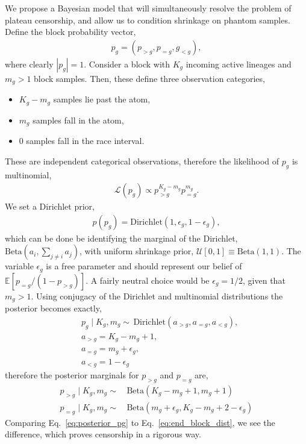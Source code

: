 \documentclass[pdflatex,sn-basic,icol]{sn-jnl}
\newcommand{\E}{\mathbb{E}}
\theoremstyle{plain}
\theoremstyle{definition}
\begin{document}
We propose a Bayesian model that will simultaneously resolve the problem of plateau censorship, and allow us to condition shrinkage on phantom samples.
Define the block probability vector,
\begin{align}
    p_g = (p_{>g}, p_{=g}, g_{<g}),
\end{align}
where clearly $|p_g| = 1$.
Consider a block with $K_g$ incoming active lineages and $m_g>1$ block samples.
Then, these define three observation categories,
\begin{itemize}
    \item $K_g - m_g$ samples lie past the atom,
    \item $m_g$ samples fall in the atom,
    \item $0$  samples fall in the race interval.
\end{itemize}
These are independent categorical observations, therefore the likelihood of $p_g$ is multinomial,
\begin{align}
    \mathcal{L}(p_g) \propto p_{>g}^{K_g - m_g} p_{=g}^{m_g}.
\end{align}
We set a Dirichlet prior,
\begin{align}
    p(p_g) = \mathrm{Dirichlet}(1, \epsilon_g, 1 - \epsilon_g),
\end{align}
which can be done be identifying the marginal of the Dirichlet, $\mathrm{Beta}(a_i, \sum_{j \neq i} a_j)$, with uniform shrinkage prior, $\mathcal{U}[0,1] \equiv \mathrm{Beta}(1, 1)$.
The variable $\epsilon_g$ is a free parameter and should represent our belief of $\E[p_{=g}/(1 - p_{>g})]$.
A fairly neutral choice would be $\epsilon_g=1/2$, given that $m_g > 1$.
Using conjugacy of the Dirichlet and multinomial distributions the posterior becomes exactly,
\begin{align}
    &p_g \mid K_g, m_g \sim\, \mathrm{Dirichlet}(a_{>g}, a_{=g}, a_{<g}),\label{eq:post_pg}\\
    &a_{>g}= K_g - m_g + 1,\\
    &a_{=g}= m_g + \epsilon_g,\\
    &a_{<g}= 1 - \epsilon_g
\end{align}
therefore the posterior marginals for $p_{>g}$ and $p_{=g}$ are,
\begin{align}
    p_{>g}  \mid K_g, m_g \sim&\, \mathrm{Beta}(K_g-m_g+1,m_g+1)\label{eq:posterior_pg}\\
    p_{=g}  \mid K_g, m_g \sim&\, \mathrm{Beta}(m_g+\epsilon_g,K_g-m_g+2-\epsilon_g)\label{eq:posterior_pe}
\end{align}
Comparing Eq.~\ref{eq:posterior_pg} to Eq.~\ref{eq:end_block_dist}, we see the difference, which proves censorship in a rigorous way.
\end{document}
